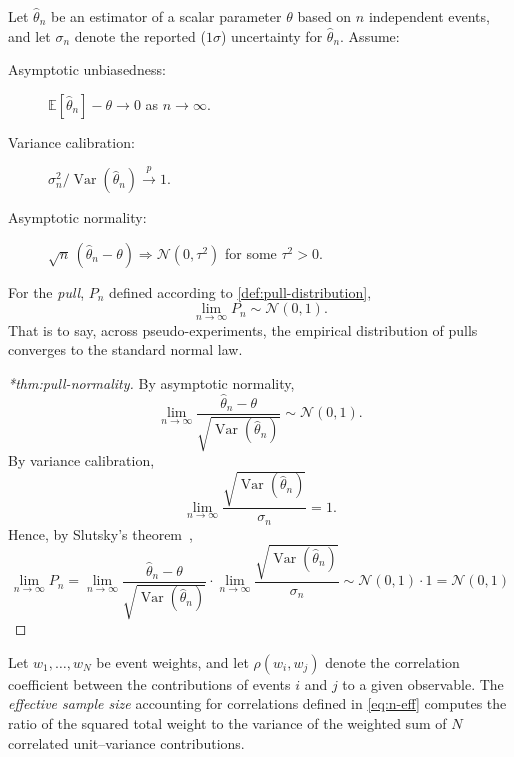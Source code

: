 \begin{theorem}
\noproofref
            
            Let \(\hat\theta_n\) be an estimator of a scalar parameter \(\theta\) based on \(n\) independent events, and let \(\sigma_n\) denote the reported (\(1\sigma\)) uncertainty for \(\hat\theta_n\). Assume:
            \begin{description}
                \item[Asymptotic unbiasedness:] \(\mathbb{E}[\hat\theta_n] - \theta \to 0\) as \(n\to\infty\).
                \item[Variance calibration:] \(\sigma_n^2 / \operatorname{Var}(\hat\theta_n) \xrightarrow{\,p\,} 1\).
                \item[Asymptotic normality:] \(\sqrt{n}\,(\hat\theta_n-\theta) \Rightarrow \mathcal N(0,\tau^2)\) for some \(\tau^2>0\).
            \end{description}
            For the \emph{pull}, \(P_n\) defined according to \cref{def:pull-distribution},
            \begin{equation}
                \lim_{n\to\infty} P_n \sim \mathcal N(0,1).
            \end{equation}
            That is to say, across pseudo-experiments, the empirical distribution of pulls converges to the standard normal law.
            \end{theorem}

\begin{proof}[*thm:pull-normality]
            By asymptotic normality,
            \[
                \lim_{n\to\infty} \frac{\hat\theta_n-\theta}{\sqrt{\operatorname{Var}(\hat\theta_n)}} \sim \mathcal N(0,1).
            \]
            By variance calibration,
            \[
                \lim_{n\to\infty} \frac{\sqrt{\operatorname{Var}(\hat\theta_n)}}{\sigma_n} = 1.
            \]
            Hence, by Slutsky's theorem~\cite{slutsky_uber_1925},
            \[
              \lim_{n\to\infty} P_n 
              = \lim_{n\to\infty} \frac{\hat\theta_n-\theta}{\sqrt{\operatorname{Var}(\hat\theta_n)}}
                \cdot \lim_{n\to\infty} \frac{\sqrt{\operatorname{Var}(\hat\theta_n)}}{\sigma_n}
              \sim \mathcal N(0,1)\cdot 1 
              = \mathcal N(0,1)
            \]
            \end{proof}

\begin{theorem}
\noproofref
                
                Let $w_1,\dots,w_N$ be event weights, and let $\rho(w_i,w_j)$ denote the correlation coefficient between the contributions of events $i$ and $j$ to a given observable. The \emph{effective sample size} accounting for correlations defined in \cref{eq:n-eff} computes the ratio of the squared total weight to the variance of the weighted sum of $N$ correlated unit--variance contributions.
            \end{theorem}


